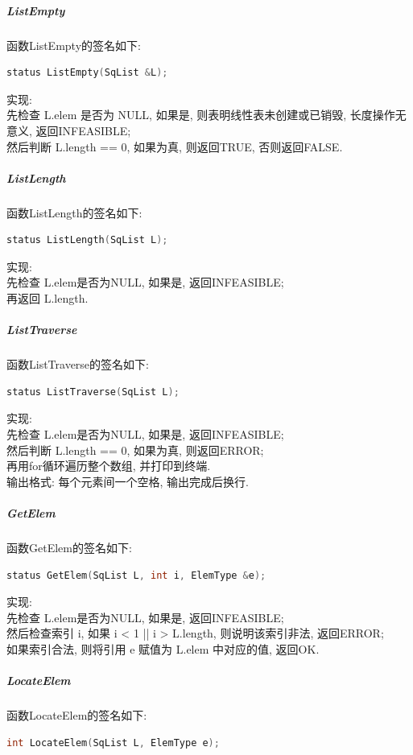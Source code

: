 \documentclass[supercite]{Experimental_Report}
\theoremstyle{definition}
\begin{document}
\subparagraph{ListEmpty}
\noindent
函数ListEmpty的签名如下:
\begin{lstlisting}[language=C++, frame=single]
status ListEmpty(SqList &L);
\end{lstlisting}

\noindent
实现: \\
先检查 L.elem 是否为 NULL, 如果是, 则表明线性表未创建或已销毁, 长度操作无意义, 返回INFEASIBLE; \\
然后判断 L.length == 0, 如果为真, 则返回TRUE, 否则返回FALSE. \\

\subparagraph{ListLength}
\noindent
函数ListLength的签名如下:
\begin{lstlisting}[language=C++, frame=single]
status ListLength(SqList L);
\end{lstlisting}

\noindent
实现: \\
先检查 L.elem是否为NULL, 如果是, 返回INFEASIBLE; \\
再返回 L.length. \\

\subparagraph{ListTraverse}
\noindent
函数ListTraverse的签名如下:
\begin{lstlisting}[language=C++, frame=single]
status ListTraverse(SqList L);
\end{lstlisting}

\noindent
实现: \\
先检查 L.elem是否为NULL, 如果是, 返回INFEASIBLE; \\
然后判断 L.length == 0, 如果为真, 则返回ERROR; \\
再用for循环遍历整个数组, 并打印到终端. \\
输出格式: 每个元素间一个空格, 输出完成后换行. \\

\subparagraph{GetElem}
\noindent
函数GetElem的签名如下:
\begin{lstlisting}[language=C++, frame=single]
status GetElem(SqList L, int i, ElemType &e);
\end{lstlisting}

\noindent
实现: \\
先检查 L.elem是否为NULL, 如果是, 返回INFEASIBLE; \\
然后检查索引 i, 如果 i < 1 || i > L.length, 则说明该索引非法, 返回ERROR; \\
如果索引合法, 则将引用 e 赋值为 L.elem 中对应的值, 返回OK.\\

\subparagraph{LocateElem}
\noindent
函数LocateElem的签名如下:
\begin{lstlisting}[language=C++, frame=single]
int LocateElem(SqList L, ElemType e);
\end{lstlisting}
\end{document}
